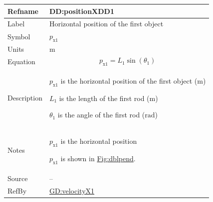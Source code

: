 \documentclass[12pt]{article}
\begin{document}
\vspace{\baselineskip}
\noindent
\begin{minipage}{\textwidth}
\begin{tabular}{>{\raggedright}p{}>{\raggedright\arraybackslash}p{}}
\toprule \textbf{Refname} & \textbf{DD:positionXDD1}
\label{DD:positionXDD1}
\\ \midrule
Label & Horizontal position of the first object
        
\\ \midrule
Symbol & ${p_{\text{x}1}}$
         
\\ \midrule
Units & ${\text{m}}$
        
\\ \midrule
Equation & \begin{displaymath}
           {p_{\text{x}1}}={L_{1}} \sin\left({θ_{1}}\right)
           \end{displaymath}
\\ \midrule
Description & \begin{symbDescription}
              \item{${p_{\text{x}1}}$ is the horizontal position of the first object (${\text{m}}$)}
              \item{${L_{1}}$ is the length of the first rod (${\text{m}}$)}
              \item{${θ_{1}}$ is the angle of the first rod (${\text{rad}}$)}
              \end{symbDescription}
\\ \midrule
Notes & ${p_{\text{x}1}}$ is the horizontal position
        
        ${p_{\text{x}1}}$ is shown in \hyperref[Figure:dblpend]{Fig:dblpend}.
        
\\ \midrule
Source & --
         
\\ \midrule
RefBy & \hyperref[GD:velocityX1]{GD:velocityX1}
        
\\ \bottomrule
\end{tabular}
\end{minipage}
\vspace{\baselineskip}
\noindent
\end{document}
